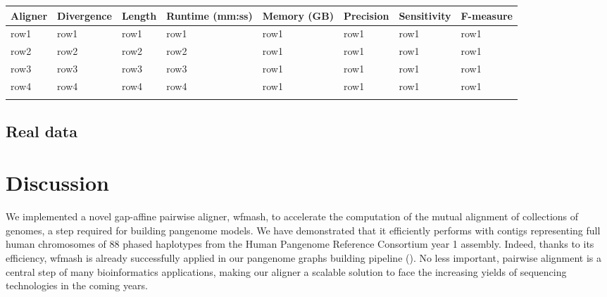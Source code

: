 \documentclass{bioinfo}
\newcommand{\wfmash}{wfmash}
\begin{document}
    \begin{table}[!t]
         {
            \begin{tabular}{@{}llllllll@{}}
                \toprule Aligner & Divergence & Length & Runtime (mm:ss) & Memory (GB) & Precision & Sensitivity & F-measure \\
                \midrule
                row1             & row1       & row1   & row1            & row1        & row1      & row1        & row1      \\
                row2             & row2       & row2   & row2            & row1        & row1      & row1        & row1      \\
                row3             & row3       & row3   & row3            & row1        & row1      & row1        & row1      \\
                row4             & row4       & row4   & row4            & row1        & row1      & row1        & row1      \\
                \botrule
            \end{tabular}
        }

    \end{table}




    \subsection{Real data}


    \section{Discussion}

    We implemented a novel gap-affine pairwise aligner, \wfmash\/, to accelerate the computation of the mutual
    alignment of collections of genomes, a step required for building pangenome models. We have demonstrated that
    it efficiently performs with contigs representing full human chromosomes of 88 phased haplotypes from the
    Human Pangenome Reference Consortium year 1 assembly. Indeed, thanks to its efficiency, wfmash is already
    successfully applied in our pangenome graphs building pipeline (\citep{pggb}). No less important, pairwise
    alignment is a central step of many bioinformatics applications, making our aligner a scalable solution to face the
    increasing yields of sequencing technologies in the coming years.
\end{document}
